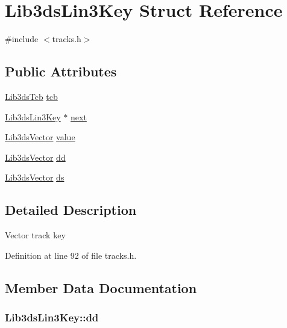 \hypertarget{struct_lib3ds_lin3_key}{\section{Lib3ds\-Lin3\-Key Struct Reference}
\label{struct_lib3ds_lin3_key}
}


{\ttfamily \#include $<$tracks.\-h$>$}

\subsection*{Public Attributes}
\begin{DoxyCompactItemize}
\item 
\hyperlink{struct_lib3ds_tcb}{Lib3ds\-Tcb} \hyperlink{struct_lib3ds_lin3_key_aac1bf0863e8537712f6cc13833658958}{tcb}
\item 
\hyperlink{struct_lib3ds_lin3_key}{Lib3ds\-Lin3\-Key} $\ast$ \hyperlink{struct_lib3ds_lin3_key_a7bc5df3705ac8a06bfb54cdb0bb3323a}{next}
\item 
\hyperlink{group__vector_ga6ac1c3b3ef15381ebf6baf264d658dcf}{Lib3ds\-Vector} \hyperlink{struct_lib3ds_lin3_key_aaf2e5ae727d4a83363fba78e0f892de7}{value}
\item 
\hyperlink{group__vector_ga6ac1c3b3ef15381ebf6baf264d658dcf}{Lib3ds\-Vector} \hyperlink{struct_lib3ds_lin3_key_a808f1c60d040e7324cbf76747e064e6c}{dd}
\item 
\hyperlink{group__vector_ga6ac1c3b3ef15381ebf6baf264d658dcf}{Lib3ds\-Vector} \hyperlink{struct_lib3ds_lin3_key_a7165fe5279ae812c30986c80d0ea8da5}{ds}
\end{DoxyCompactItemize}


\subsection{Detailed Description}
Vector track key 

Definition at line 92 of file tracks.\-h.



\subsection{Member Data Documentation}
\hypertarget{struct_lib3ds_lin3_key_a808f1c60d040e7324cbf76747e064e6c}{
\subsubsection[{dd}]{ Lib3ds\-Lin3\-Key\-::dd}}\label{struct_lib3ds_lin3_key_a808f1c60d040e7324cbf76747e064e6c}


